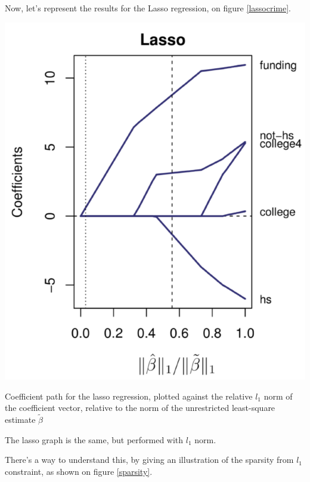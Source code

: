 Now, let's represent the results for the Lasso regression, on figure
\ref{lassocrime}.
\begin{marginfigure}
    \includegraphics{./Figures/lassocrime.png}
    \caption{Coefficient path for the lasso regression, plotted against the
        relative $l_1$ norm of the coefficient vector, relative to the norm of
        the unrestricted least-square estimate $\tilde \beta$
    }
    \label{lassocrime}
\end{marginfigure}


The lasso graph is the same, but performed with $l_1$ norm.

There’s a way to understand this, by giving an illustration of the sparsity from
$l_1$ constraint, as shown on figure \ref{sparsity}.

